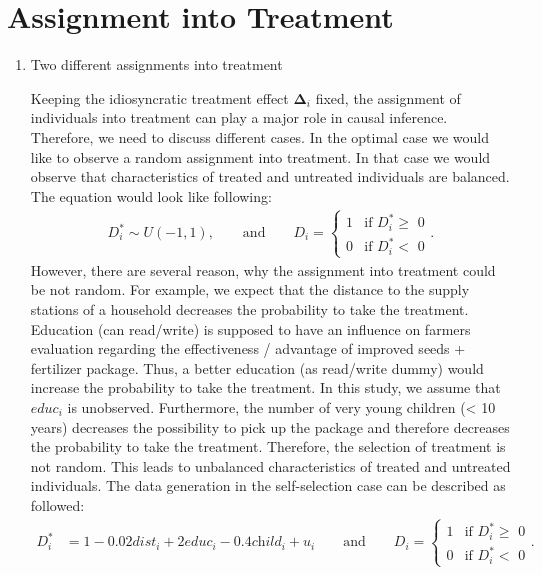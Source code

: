 \section{Assignment into Treatment} \label{sec:assignment}

\begin{enumerate}
\item Two different assignments into treatment

Keeping the idiosyncratic treatment effect $\boldsymbol{\Delta}_i$ fixed, the assignment of individuals into treatment can play a major role in causal inference. Therefore, we need to discuss different cases. In the optimal case we would like to observe a random assignment into treatment. In that case we would observe that characteristics of treated and untreated individuals are balanced. The equation would look like following:
\begin{align}
	\label{eq:eq5}
	\textit{D}_i^\ast \sim U(-1, 1), 
	\qquad \text{and}  \qquad
 	\textit{D}_i =
    	\begin{cases}
      1 & \text{if $\textit{D}_i^\ast \geq$ 0}\\
      0 & \text{if $\textit{D}_i^\ast <$ 0}
    	\end{cases}. 
\end{align}
However, there are several reason, why the assignment into treatment could be not random. For example, we expect that the distance to the supply stations of a household decreases the probability to take the treatment. Education (can read/write) is supposed to have an influence on farmers evaluation regarding the effectiveness / advantage of improved seeds + fertilizer package. Thus, a better education (as read/write dummy) would increase the probability to take the treatment. In this study, we assume that $\textit{educ}_i$ is unobserved. Furthermore, the number of very young children (< 10 years) decreases the possibility to pick up the package and therefore decreases the probability to take the treatment. Therefore, the selection of treatment is not random. This leads to unbalanced characteristics of treated and untreated individuals. The data generation in the self-selection case can be described as followed:
\begin{align}
	\label{eq:eq6}
	\textit{D}_i^\ast &= 1 - 0.02 \textit{dist}_i + 2 \textit{educ}_i -  0.4 \textit{child}_i + \textit{u}_i 
	\qquad \text{and}  \qquad  
	\textit{D}_i =
    \begin{cases}
      1 & \text{if $\textit{D}_i^\ast \geq$ 0}\\
      0 & \text{if $\textit{D}_i^\ast <$ 0}
    \end{cases}. 
\end{align}


\end{enumerate}
